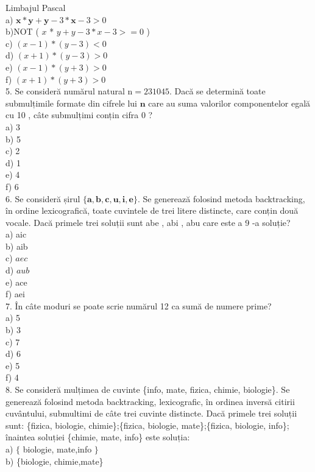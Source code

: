 Limbajul Pascal\\
a) $\mathbf{x *} \mathbf{y}+\mathbf{y}-3 * \mathbf{x}-3>0$\\
b)NOT ( $x$ * $y+y-3 * x-3>=0$ )\\
c) $(x-1) *(y-3)<0$\\
d) $(x+1) *(y-3)>0$\\
e) $(x-1) *(y+3)>0$\\
f) $(x+1) *(y+3)>0$\\
5. Se consideră numărul natural $\mathrm{n}=231045$. Dacă se determină toate submulțimile formate din cifrele lui $\mathbf{n}$ care au suma valorilor componentelor egală cu 10 , câte submulțimi conțin cifra 0 ?\\
a) 3\\
b) 5\\
c) 2\\
d) 1\\
e) 4\\
f) 6\\
6. Se consideră șirul $\{\mathbf{a}, \mathbf{b}, \mathbf{c}, \mathbf{u}, \mathbf{i}, \mathbf{e}\}$. Se generează folosind metoda backtracking, în ordine lexicografică, toate cuvintele de trei litere distincte, care conțin două vocale. Dacă primele trei soluții sunt abe , abi , abu care este a 9 -a soluție?\\
a) aic\\
b) aib\\
c) $a e c$\\
d) $a u b$\\
e) ace\\
f) aei\\
7. În câte moduri se poate scrie numărul 12 ca sumă de numere prime?\\
a) 5\\
b) 3\\
c) 7\\
d) 6\\
e) 5\\
f) 4\\
8. Se consideră mulțimea de cuvinte \{info, mate, fizica, chimie, biologie\}. Se generează folosind metoda backtracking, lexicografic, în ordinea inversă citirii cuvântului, submultimi de câte trei cuvinte distincte. Dacă primele trei soluții sunt: \{fizica, biologie, chimie\};\{fizica, biologie, mate\};\{fizica, biologie, info\}; înaintea soluției \{chimie, mate, info\} este soluția:\\
a) $\{$ biologie, mate,info $\}$\\
b) \{biologie, chimie,mate\}\\
